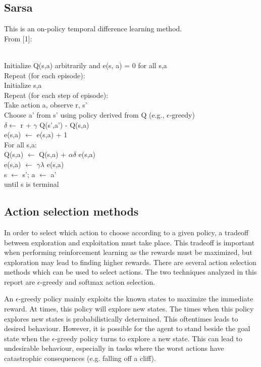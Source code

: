 \documentclass{article}
\newcommand{\tab}{\hspace{10mm}}
\newcommand{\dtab}{\hspace{20mm}}
\newcommand{\ttab}{\hspace{30mm}}
\begin{document}
\subsection*{Sarsa}
This is an on-policy temporal difference learning method. %
\\
From [1]: \\\\
\begin{algorithm}[H]
Initialize Q(s,a) arbitrarily and e(s, a) = 0 for all s,a \\
Repeat (for each episode):\\
\tab Initialize s,a\\
\tab Repeat (for each step of episode):\\
\dtab Take action a, observe r, s'\\
\dtab Choose a' from s' using policy derived from Q (e.g., $\epsilon$-greedy)\\
\dtab $\delta \leftarrow$ r + $\gamma$ Q(s',a') - Q(s,a)\\
\dtab e(s,a) $\leftarrow$ e(s,a) + 1\\
\dtab For all s,a:\\
\ttab Q(s,a) $\leftarrow$ Q(s,a) + $\alpha \delta$ e(s,a) \\
\ttab e(s,a) $\leftarrow$ $\gamma \lambda$ e(s,a)\\
\dtab s $\leftarrow$ s'; a $\leftarrow$ a'\\
\tab until s is terminal\\
\end{algorithm}

\subsection*{Action selection methods}
In order to select which action to choose according to a given policy, a tradeoff between exploration and exploitation must take place. This tradeoff is important when performing reinforcement learning as the rewards must be maximized, but exploration may lead to finding higher rewards. There are several action selection methods which can be used to select actions. The two techniques analyzed in this report are $\epsilon$-greedy and softmax action selection.

An $\epsilon$-greedy policy mainly exploits the known states to maximize the immediate reward. At times, this policy will explore new states. The times when this policy explores new states is probabilistically determined. This oftentimes leads to desired behaviour. However, it is possible for the agent to stand beside the goal state when the $\epsilon$-greedy policy turns to explore a new state. This can lead to undesirable behaviour, especially in tasks where the worst actions have catastrophic consequences (e.g. falling off a cliff).
\end{document}
